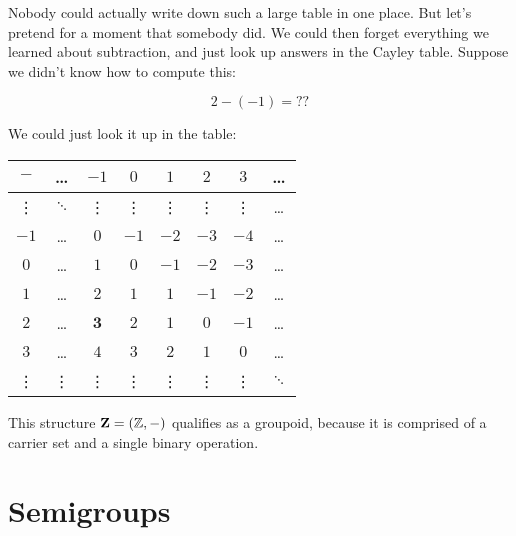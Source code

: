 \documentclass[../../../main.tex]{subfiles}
\begin{document}
\begin{example}
Nobody could actually write down such a large table in one place. But let's pretend for a moment that somebody did. We could then forget everything we learned about subtraction, and just look up answers in the Cayley table. Suppose we didn't know how to compute this:

\begin{equation*}
  2 - (-1) = ??
\end{equation*}

We could just look it up in the table:
    
\begin{center}
  \begin{tabular}{| c || c | c | c | c | c | c | c |}
    \hline
    $-$    & \ldots   & \cellcolor{grey3} $-1$   & $0$    & $1$    & $2$    & $3$    & \ldots
    \\ \hline \hline
    \vdots & $\ddots$ & \cellcolor{grey3} \vdots & \vdots & \vdots & \vdots & \vdots & \ldots
    \\ \hline
    $-1$   & \ldots   & \cellcolor{grey3} $0$    & $-1$   & $-2$   & $-3$   & $-4$   & \ldots
    \\ \hline
    $0$    & \ldots   & \cellcolor{grey3} $1$    & $0$    & $-1$   & $-2$   & $-3$   & \ldots
    \\ \hline
    $1$    & \ldots   & \cellcolor{grey3} $2$    & $1$    & $1$    & $-1$   & $-2$   & \ldots
    \\ \hline
    \cellcolor{grey3} $2$    & \cellcolor{grey3} \ldots   & \cellcolor{grey3} $\mathbf{3}$    & $2$    & $1$    & $0$    & $-1$   & \ldots
    \\ \hline
    $3$    & \ldots   & $4$    & $3$    & $2$    & $1$    & $0$    & \ldots
    \\ \hline
    \vdots & \vdots   & \vdots & \vdots & \vdots & \vdots & \vdots & $\ddots$
    \\ \hline
  \end{tabular}
\end{center}

This structure $\algebra{Z} = (\Ints/, -)$ qualifies as a groupoid, because it is comprised of a carrier set and a single binary operation.

\end{example}



\section{Semigroups}
\end{document}
